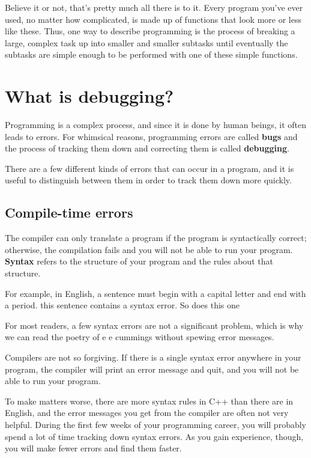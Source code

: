 Believe it or not, that's pretty much all there is to it.
Every program you've ever used, no matter how complicated, is
made up of functions that look more or less like these.  Thus,
one way to describe programming is the process of breaking a
large, complex task up into smaller and smaller subtasks
until eventually the subtasks are simple enough to be performed
with one of these simple functions.

\section{What is debugging?}

Programming is a complex process, and since it is done by
human beings, it often leads to errors.  For whimsical reasons,
programming errors are called {\bf bugs} and the process
of tracking them down and correcting them is called
{\bf debugging}.

There are a few different kinds of errors that can occur
in a program, and it is useful to distinguish between them
in order to track them down more quickly.

\subsection{Compile-time errors}

The compiler can only translate a program if the program is
syntactically correct; otherwise, the compilation fails and
you will not be able to run your program.  {\bf Syntax}
refers to the structure of your program and the rules about
that structure.


For example, in English, a sentence must begin with a capital
letter and end with a period.  this sentence contains a syntax
error.  So does this one

For most readers, a few syntax errors are not a significant
problem, which is why we can read the poetry of e e cummings
without spewing error messages.

Compilers are not so forgiving.  If there is a single syntax
error anywhere in your program, the compiler will print an
error message and quit, and you will not be able to run
your program.

To make matters worse, there are more syntax rules in C++
than there are in English, and the error messages you get from
the compiler are often not very helpful.  During the first
few weeks of your programming career, you will probably
spend a lot of time tracking down syntax errors.  As you
gain experience, though, you will make fewer errors and find
them faster.

